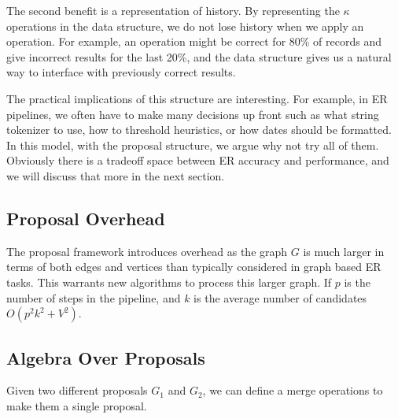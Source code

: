 The second benefit is a representation of history. 
By representing the $\kappa$ operations in the data structure, we do not lose history when we apply an operation.
For example, an operation might be correct for 80\% of records and give incorrect results for the last 20\%, and the data structure gives us a natural way to interface with previously correct results.

The practical implications of this structure are interesting. 
For example, in ER pipelines, we often have to make many decisions up front such as what string tokenizer to use, how to threshold heuristics, or how dates should be formatted.
In this model, with the proposal structure, we argue why not try all of them.
Obviously there is a tradeoff space between ER accuracy and performance, and we will discuss that more in the next section.

\subsection{Proposal Overhead}
The proposal framework introduces overhead as the graph $G$ is much larger in terms of both edges and vertices than typically considered in graph based ER tasks. 
This warrants new algorithms to process this larger graph.
If $p$ is the number of steps in the pipeline, and $k$ is the average number of candidates $O(p^2k^2+V^2)$.

\subsection{Algebra Over Proposals}
Given two different proposals $G_1$ and $G_2$, we can define a merge operations to make them a single proposal.

